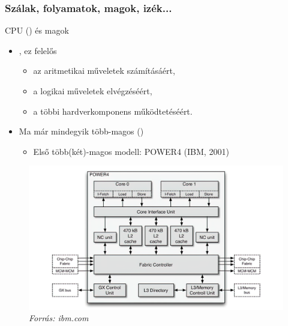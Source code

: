 \begin{frame}
\frametitle{Szálak, folyamatok, magok, izék...}

 {
\begin{block}{CPU () és magok}
	\begin{itemize}
		\item {}, ez felelős
		\begin{itemize}
			\item az aritmetikai műveletek számításáért,
			\item a logikai műveletek elvégzéséért,
			\item a többi hardverkomponens működtetéséért.
		\end{itemize}
		\item Ma már mindegyik több-magos ()
		\begin{itemize}
			\item Első több(két)-magos modell: POWER4 (IBM, 2001)
		\end{itemize}
	\end{itemize}
\end{block}
}

 {
\begin{figure}
	\includegraphics[width=\textwidth]{img/power4-2x.png}
	{\hspace*{\fill}\tiny\textit{Forrás: ibm.com}}	
\end{figure}
}


\end{frame}

